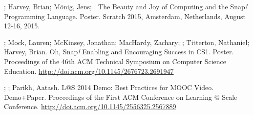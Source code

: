 \begin{etaremune}
    \item{\dan; Harvey, Brian; Mönig, Jens; \me. The Beauty and Joy of Computing and the Snap\textit{!} Programming Language. Poster. Scratch 2015, Amsterdam, Netherlands, August 12-16, 2015.}

    \item{\me; Mock, Lauren; McKinsey, Jonathan; MacHardy, Zachary; \dan; Titterton, Nathaniel; Harvey, Brian. Oh, Snap\textit{!} Enabling and Encouraging Success in CS1. Poster. Proceedings of the 46th ACM Technical Symposium on Computer Science Education.} \newline\href{http://doi.acm.org/10.1145/2676723.2691947}{http://doi.acm.org/10.1145/2676723.2691947}
    

    \item{\dan; \me; Parikh, Aatash. L@S 2014 Demo: Best Practices for MOOC Video. Demo+Paper. Proceedings of the First ACM Conference on Learning @ Scale Conference.} \href{http://doi.acm.org/10.1145/2556325.2567889}{http://doi.acm.org/10.1145/2556325.2567889}

\end{etaremune}
